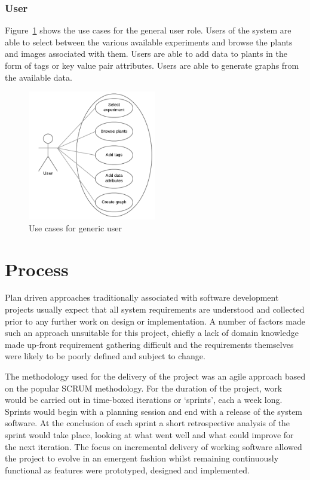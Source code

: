 \subsubsection{User}

Figure~\ref{fig:user_case} shows the use cases for the general user role. Users of the system are able to select between the various available experiments and browse the plants and images associated with them. Users are able to add data to plants in the form of tags or key value pair attributes. Users are able to generate graphs from the available data.

\begin{figure}[H]
    \centering
    \includegraphics[width=0.5\textwidth]{images/analysis/user_case}
    \caption{Use cases for generic user}
    \label{fig:user_case}
\end{figure}

\section{Process}

Plan driven approaches traditionally associated with software development projects usually expect that all system requirements are understood and collected prior to any further work on design or implementation. A number of factors made such an approach unsuitable for this project, chiefly a lack of domain knowledge made up-front requirement gathering difficult and the requirements themselves were likely to be poorly defined and subject to change. 

The methodology used for the delivery of the project was an agile approach based on the popular SCRUM methodology. For the duration of the project, work would be carried out in time-boxed iterations or `sprints', each a week long. Sprints would begin with a planning session and end with a release of the system software. At the conclusion of each sprint a short retrospective analysis of the sprint would take place, looking at what went well and what could improve for the next iteration. The focus on incremental delivery of working software allowed the project to evolve in an emergent fashion whilst remaining continuously functional as features were prototyped, designed and implemented.  

